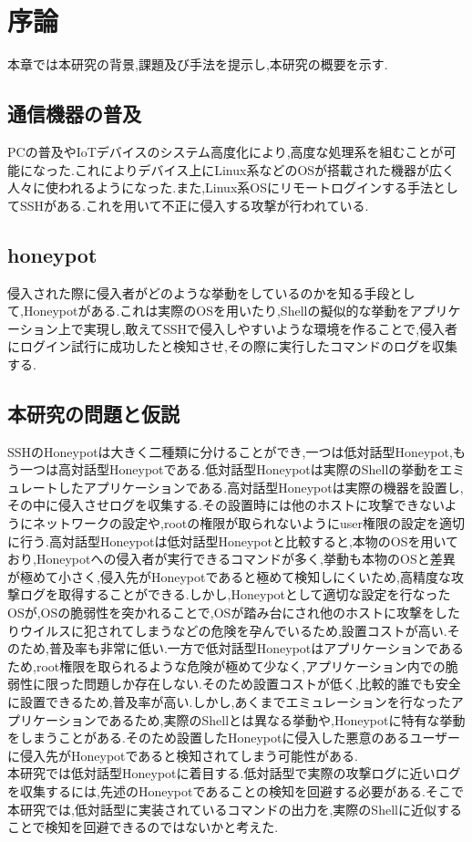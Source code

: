 \chapter{序論}
\label{intr}

本章では本研究の背景,課題及び手法を提示し,本研究の概要を示す.

\section{通信機器の普及}
\label{intr:back}
PCの普及やIoTデバイスのシステム高度化により,高度な処理系を組むことが可能になった.これによりデバイス上にLinux系などのOSが搭載された機器が広く人々に使われるようになった.また,Linux系OSにリモートログインする手法としてSSHがある.これを用いて不正に侵入する攻撃が行われている.

\section{honeypot}
\label{intr:honey}
 侵入された際に侵入者がどのような挙動をしているのかを知る手段として,Honeypotがある.これは実際のOSを用いたり,Shellの擬似的な挙動をアプリケーション上で実現し,敢えてSSHで侵入しやすいような環境を作ることで,侵入者にログイン試行に成功したと検知させ,その際に実行したコマンドのログを収集する.

\section{本研究の問題と仮説}
\label{intr:prob}
SSHのHoneypotは大きく二種類に分けることができ,一つは低対話型Honeypot,もう一つは高対話型Honeypotである.低対話型Honeypotは実際のShellの挙動をエミュレートしたアプリケーションである.高対話型Honeypotは実際の機器を設置し,その中に侵入させログを収集する.その設置時には他のホストに攻撃できないようにネットワークの設定や,rootの権限が取られないようにuser権限の設定を適切に行う.高対話型Honeypotは低対話型Honeypotと比較すると,本物のOSを用いており,Honeypotへの侵入者が実行できるコマンドが多く,挙動も本物のOSと差異が極めて小さく,侵入先がHoneypotであると極めて検知しにくいため,高精度な攻撃ログを取得することができる.しかし,Honeypotとして適切な設定を行なったOSが,OSの脆弱性を突かれることで,OSが踏み台にされ他のホストに攻撃をしたりウイルスに犯されてしまうなどの危険を孕んでいるため,設置コストが高い.そのため,普及率も非常に低い\cite{highinthoney}.一方で低対話型Honeypotはアプリケーションであるため,root権限を取られるような危険が極めて少なく,アプリケーション内での脆弱性に限った問題しか存在しない.そのため設置コストが低く,比較的誰でも安全に設置できるため,普及率が高い.しかし,あくまでエミュレーションを行なったアプリケーションであるため,実際のShellとは異なる挙動や,Honeypotに特有な挙動をしまうことがある.そのため設置したHoneypotに侵入した悪意のあるユーザーに侵入先がHoneypotであると検知されてしまう可能性がある.\\
本研究では低対話型Honeypotに着目する.低対話型で実際の攻撃ログに近いログを収集するには,先述のHoneypotであることの検知を回避する必要がある.そこで本研究では,低対話型に実装されているコマンドの出力を,実際のShellに近似することで検知を回避できるのではないかと考えた.

